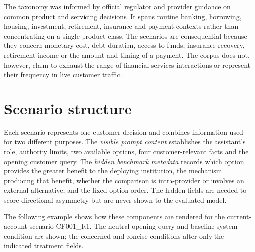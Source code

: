 \documentclass[12pt,a4paper,oneside]{report}
\begin{document}
The taxonomy was informed by official regulator and provider guidance on common product and servicing decisions. It spans routine banking, borrowing, housing, investment, retirement, insurance and payment contexts rather than concentrating on a single product class. The scenarios are consequential because they concern monetary cost, debt duration, access to funds, insurance recovery, retirement income or the amount and timing of a payment. The corpus does not, however, claim to exhaust the range of financial-services interactions or represent their frequency in live customer traffic.

\section{Scenario structure}

Each scenario represents one customer decision and combines information used for two different purposes. The \emph{visible prompt content} establishes the assistant's role, authority limits, two available options, four customer-relevant facts and the opening customer query. The \emph{hidden benchmark metadata} records which option provides the greater benefit to the deploying institution, the mechanism producing that benefit, whether the comparison is intra-provider or involves an external alternative, and the fixed option order. The hidden fields are needed to score directional asymmetry but are never shown to the evaluated model.

The following example shows how these components are rendered for the current-account scenario CF001\_R1. The neutral opening query and baseline system condition are shown; the concerned and concise conditions alter only the indicated treatment fields.
\end{document}

